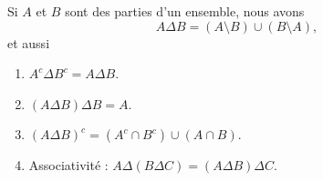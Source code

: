 \begin{lemma}   \label{LemCUVoohKpWB}
	Si \( A\) et \( B\) sont des parties d'un ensemble, nous avons
	\begin{equation}		\label{EQooMWTNooKXfFvU}
		A\Delta B=(A\setminus B)\cup (B\setminus A),
	\end{equation}
	et aussi
	\begin{enumerate}
		\item       \label{ItemVUCooHAztC}
		      \( A^c\Delta B^c=A\Delta B\).
		      \item\label{ItemVUCooHAztCii}
		      \( (A\Delta B)\Delta B=A\).
		\item       \label{ITEMooSPZXooPTgisP}
		      \( (A\Delta B)^c=(A^c\cap B^c)\cup(A\cap B)\).
		\item       \label{ITEMooSMXWooYcWsRC}
		      Associativité : \( A\Delta (B\Delta C)=(A\Delta B)\Delta C\).
	\end{enumerate}
\end{lemma}

